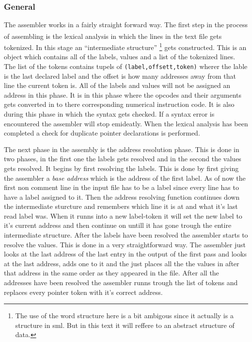 \documentclass{article}
\begin{document}
\subsubsection{General}
The assembler works in a fairly straight forward way. The first step in the
process of assembling is the lexical
analysis\textsuperscript{\cite{lexi}} in which the lines in the text file gets
tokenized. In this stage an ``intermediate structure'' \footnote{The use of the word structure here is a bit ambigous since it
actually is a structure in sml. But in this text it will reffere to an abstract
structure of data.} gets constructed.
This is an object which contains all of the labels, values and a list of the
tokenized lines. The list of the tokens contains tupels of
\verb+(label,offsett,token)+ wherer the lable is the last declared label and
the offset is how many addresses away from that line the current token is. All
of the labels and values will not be assigned an address in this phase. It is in
this phase where the opcodes and their arguments gets converted in to there
corresponding numerical instruction code. It is also during this phase in which
the syntax gets checked. If a syntax error is encountered the assembler will
stop emideatly. When the lexical analysis has been completed a check for
duplicate pointer declarations is performed.

The next phase in the assembly is the address resolution phase. This is done in
two phases, in the first one the labels gets resolved and in the second the
values gets  resolved. It begins by first resolving the labels.
This is done by first giving the assembler a \emph{base address} which is 
the address of the first label. As of now the first
non comment line in the input file has to be a label since every line has to
have a label assigned to it. Then the address resolving function continues
down the intermediate sturcture and remembers which line it is at and what it's
last read label was. When it runns into a new label-token it will set the new
label to it's current address and then continue on untill it has gone trough the entire
intermediate structure. After the labels have been resolved the assembler starts
to resolve the values. This is done in a very straightforward way. The assembler
just looks at the last address of the last entry in the output of the first
pass and looks at the last address, adds one to it and the just places all the
the values in after that address in the same order as they appeared in the file.
After all the addresses have been resolved the assembler runns trough the list
of tokens and replaces every pointer token with it's correct address.
\end{document}
